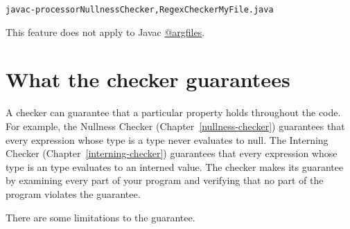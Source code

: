 \begin{alltt}
  javac -processor NullnessChecker,RegexChecker MyFile.java
\end{alltt}

This feature does not apply to Javac \href{https://docs.oracle.com/javase/7/docs/technotes/tools/windows/javac.html#commandlineargfile}{@argfiles}.


\section{What the checker guarantees\label{checker-guarantees}}

A checker can guarantee that a particular property holds throughout the
code.  For example, the Nullness Checker (Chapter~\ref{nullness-checker})
guarantees that every expression whose type is a  type never
evaluates to null.  The Interning Checker (Chapter~\ref{interning-checker})
guarantees that every expression whose type is an  type
evaluates to an interned value.  The checker makes its guarantee by
examining every part of your program and verifying that no part of the
program violates the guarantee.

There are some limitations to the guarantee.


